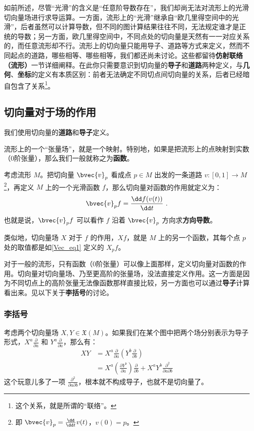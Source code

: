 如前所述，尽管“光滑”的含义是“任意阶导数存在”，我们却尚无法对流形上的光滑切向量场进行求导运算。一方面，流形上的“光滑”继承自“欧几里得空间中的光滑”，后者虽然可以计算导数，但不同的图计算结果往往不同，无法规定谁才是正统的导数；另一方面，欧几里得空间中，不同点处的切向量是天然有一一对应关系的，而任意流形却不行。流形上的切向量只能用导子、道路等方式来定义，然而不同起点的道路，哪些相等、哪些相等，我们都还尚未讨论。这些都留待\textbf{仿射联络（流形）}一节详细阐释。在此你只需要意识到切向量的\textbf{导子}和\textbf{道路}两种定义，与\textbf{几何}、\textbf{坐标}的定义有本质区别：前者无法确定不同切点间切向量的关系，后者已经暗自包含了关系\footnote{这个关系，就是所谓的“联络”。}。


\subsection{切向量对于场的作用}
我们使用切向量的\textbf{道路}和\textbf{导子}定义。

流形上的一个“张量场”，就是一个映射。特别地，如果是把流形上的点映射到实数（0阶张量），那么我们一般就称之为\textbf{函数}。

考虑流形 $M$。把切向量 $\bvec{v}_p$ 看成点 $p\in M$ 出发的一条道路 $v:[0, 1]\to M$\footnote{即 $\bvec{v}_p=\frac{\dd}{\dd t}v(t)$，$v(0)=p$。}，再定义 $M$ 上的一个光滑函数 $f$，那么切向量对函数的作用就定义为：
\begin{equation}\label{Vec_eq1}
\bvec{v}_pf=\frac{\dd f(v(t))}{\dd t}~.
\end{equation}
也就是说，$\bvec{v}_pf$ 可以看作 $f$ 沿着 $\bvec{v}_p$ 方向求\textbf{方向导数}。

类似地，切向量场 $X$ 对于 $f$ 的作用，$Xf$，就是 $M$ 上的另一个函数，其每个点 $p$ 处的取值都是如\autoref{Vec_eq1} 定义的 $X_p f$。

对于一般的流形，只有函数（0阶张量）可以像上面那样，定义切向量对函数的作用。切向量对切向量场、乃至更高阶的张量场，没法直接定义作用。这一方面是因为不同切点上的高阶张量无法像函数那样直接比较，另一方面也可以通过\textbf{导子}计算看出来。见以下关于\textbf{李括号}的讨论。

\subsubsection{李括号}

考虑两个切向量场 $X, Y\in\mathfrak{X}(M)$。如果我们在某个图中把两个场分别表示为导子形式，$X^a\frac{\partial}{\partial a}$ 和 $Y^a\frac{\partial}{\partial a}$，那么有：
\begin{equation}
\begin{aligned}
XY&=X^a\frac{\partial}{\partial a}(Y^b\frac{\partial}{\partial b})\\
&=X^a(\frac{\partial Y^b}{\partial a})\frac{\partial}{\partial b}+X^aY^b\frac{\partial^2}{\partial a\partial b}
\end{aligned}
\end{equation}
这个玩意儿多了一项 $\frac{\partial^2}{\partial a\partial b}$，根本就不构成导子，也就不是切向量了。

